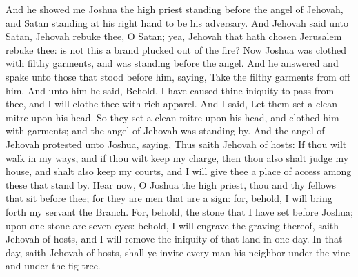 And he showed me Joshua the high priest standing before the angel of Jehovah, and Satan standing at his right hand to be his adversary. And Jehovah said unto Satan, Jehovah rebuke thee, O Satan; yea, Jehovah that hath chosen Jerusalem rebuke thee: is not this a brand plucked out of the fire? Now Joshua was clothed with filthy garments, and was standing before the angel. And he answered and spake unto those that stood before him, saying, Take the filthy garments from off him. And unto him he said, Behold, I have caused thine iniquity to pass from thee, and I will clothe thee with rich apparel. And I said, Let them set a clean mitre upon his head. So they set a clean mitre upon his head, and clothed him with garments; and the angel of Jehovah was standing by.  And the angel of Jehovah protested unto Joshua, saying, Thus saith Jehovah of hosts: If thou wilt walk in my ways, and if thou wilt keep my charge, then thou also shalt judge my house, and shalt also keep my courts, and I will give thee a place of access among these that stand by. Hear now, O Joshua the high priest, thou and thy fellows that sit before thee; for they are men that are a sign: for, behold, I will bring forth my servant the Branch. For, behold, the stone that I have set before Joshua; upon one stone are seven eyes: behold, I will engrave the graving thereof, saith Jehovah of hosts, and I will remove the iniquity of that land in one day. In that day, saith Jehovah of hosts, shall ye invite every man his neighbor under the vine and under the fig-tree. 

